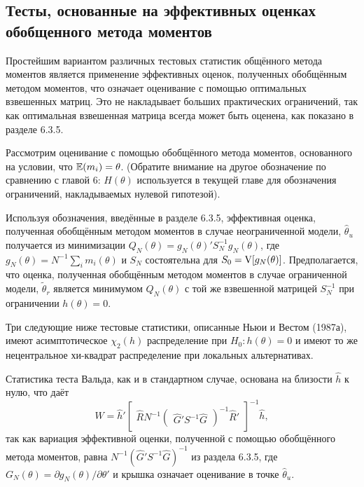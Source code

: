 \subsection{Тесты, основанные на эффективных оценках обобщенного метода моментов}

Простейшим вариантом различных тестовых статистик общённого метода моментов является применение эффективных оценок, полученных обобщённым методом моментов, что означает оценивание с помощью оптимальных взвешенных матриц. Это не накладывает больших практических ограничений, так как оптимальная взвешенная матрица всегда может быть оценена, как показано в разделе 6.3.5.

Рассмотрим оценивание с помощью обобщённого метода моментов, основанного на условии, что $\mathbb{E}(m_i) = \theta$. (Обратите внимание на другое обозначение по сравнению с главой 6: $H(\theta)$ используется в текущей главе для
обозначения ограничений, накладываемых нулевой гипотезой).

Используя обозначения, введённые в разделе 6.3.5, эффективная оценка, полученная обобщённым методом моментов в случае неограниченной модели, $\hat{\theta}_u$ получается из минимизации $Q_N(\theta) = g_N(\theta)'S_N^{-1}g_N(\theta)$, где $g_N(\theta) = N^{-1}\sum_i m_i(\theta)$ и $S_N$ состоятельна для $S_0 = \mathrm{V}[g_N(\theta)]$. Предполагается, что оценка, полученная обобщённым методом моментов в случае ограниченной модели, $\tilde{\theta}_r$ является минимумом $Q_N(\theta)$ с той же взвешенной матрицей $S_N^{-1}$ при ограничении $h(\theta) = 0$.

Три следующие ниже тестовые статистики, описанные Ньюи и Вестом (1987а), имеют асимптотическое $\chi_2(h)$ распределение при $H_0: h(\theta) = 0$ и имеют то же нецентральное хи-квадрат распределение при локальных альтернативах.

Статистика теста Вальда, как и в стандартном случае, основана на близости $\hat{h}$ к нулю, что даёт
\begin{equation}
W = \hat{h}'\begin{bmatrix} \hat{R}N^{-1}\begin{pmatrix} \hat{G}'S^{-1}\hat{G} \end{pmatrix}^{-1} \hat{R}'\end{bmatrix}^{-1}\hat{h},
\end{equation}
так как вариация эффективной оценки, полученной с помощью обобщённого метода моментов, равна $N^{-1}(\hat{G}'S^{-1}\hat{G})^{-1}$ из раздела 6.3.5, где $G_N(\theta) = \partial{g_N(\theta)}/\partial{\theta}'$ и крышка означает оценивание в точке $\hat{\theta}_u$.

